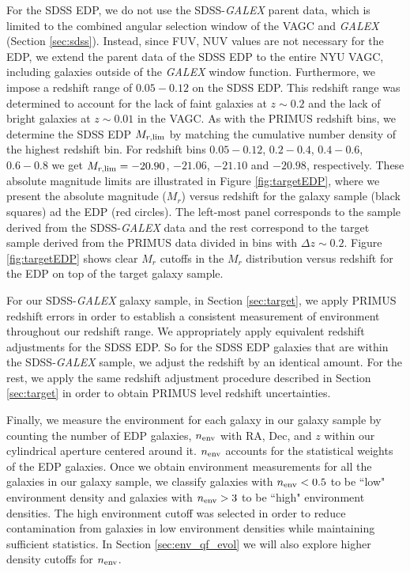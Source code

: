 \documentclass{emulateapj}
\begin{document}
For the SDSS EDP, we do not use the SDSS-{\em GALEX} parent data,
which is limited to the combined angular selection window of the
VAGC and {\em GALEX} (Section \ref{sec:sdss}). Instead, since FUV, NUV
values are not necessary for the EDP, we extend the parent data of the
SDSS EDP to the entire NYU VAGC, including galaxies outside of the
{\em GALEX} window function. Furthermore, we impose a redshift range
of $0.05-0.12$ on the SDSS EDP. This redshift range was determined to
account for the lack of faint galaxies at $z \sim 0.2$ and the lack of
bright galaxies at $z \sim 0.01$ in the VAGC. As with the PRIMUS
redshift bins, we determine the SDSS EDP $M_{r, \rm{lim}}$ by matching
the cumulative number density of the highest redshift bin. For
redshift bins $0.05-0.12$, $0.2-0.4$, $0.4-0.6$, $0.6-0.8$ we get
$M_{r,\rm{lim}} = -20.90$, $-21.06$, $-21.10$ and $-20.98$,
respectively. These absolute magnitude limits are illustrated in
Figure \ref{fig:targetEDP}, where we present the absolute magnitude ($M_{r}$) versus redshift for the galaxy sample (black squares) ad the EDP (red circles). 
The left-most panel corresponds to the sample derived from the SDSS-{\em GALEX} data and the rest correspond to the target sample derived from the PRIMUS data divided in bins with $\Delta z \sim 0.2$. 
Figure \ref{fig:targetEDP} shows clear $M_r$ cutoffs in the
$M_{r}$ distribution versus redshift for the EDP on top
of the target galaxy sample.

For our SDSS-{\em GALEX} galaxy sample, in Section \ref{sec:target}, we apply PRIMUS redshift errors in order to establish a consistent measurement of environment throughout our redshift range. We appropriately apply equivalent redshift adjustments for the SDSS EDP. So for the SDSS EDP galaxies that are within the SDSS-{\em GALEX} sample, we adjust the redshift by an identical amount. For the rest, we apply the same redshift adjustment procedure described in Section \ref{sec:target} in order to obtain PRIMUS level redshift uncertainties. 

Finally, we measure the environment for each galaxy in our galaxy
sample by counting the number of EDP galaxies, $n_{\rm{env}}$ with RA,
Dec, and $z$ within our cylindrical aperture centered around
it. $n_{\rm{env}}$ accounts for the statistical weights of the EDP
galaxies. Once we obtain environment measurements for all the galaxies
in our galaxy sample, we classify galaxies with $n_{\rm{env}} < 0.5$
to be ``low" environment density and galaxies with $n_{\rm{env}} > 3$
to be ``high" environment densities. The high environment cutoff was
selected in order to reduce contamination from galaxies in low
environment densities while maintaining sufficient statistics. In
Section \ref{sec:env_qf_evol} we will also explore higher density
cutoffs for $n_{\rm{env}}$.
\end{document}
